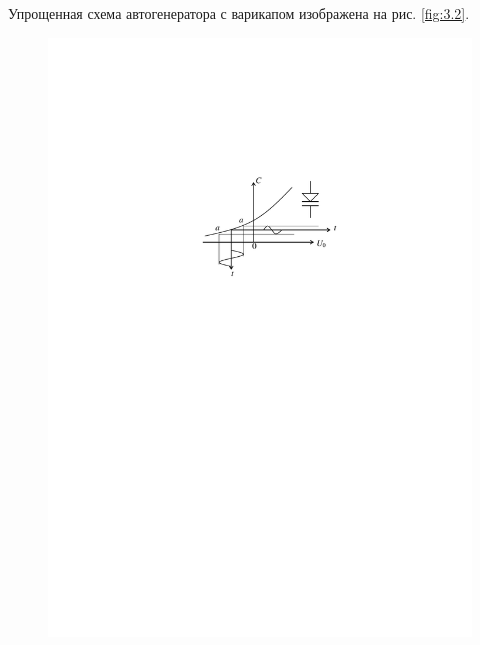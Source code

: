 Упрощенная схема автогенератора с варикапом изображена на рис. \ref{fig:3.2}.
\begin{figure}[H]
	\centering
	\includegraphics[]{fig/fig3-1}
	\caption{}
	\label{fig:3.1}
\end{figure}
